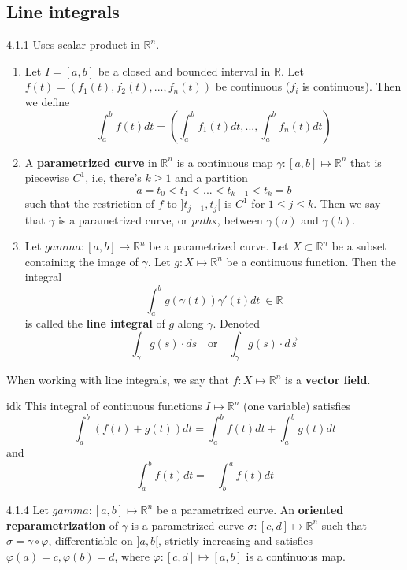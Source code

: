 \documentclass[8pt,a4paper,twocolumn,table]{extarticle}
\newcommand{\R}{\mathbb{R}}
\begin{document}
\subsection{Line integrals}
\begin{definition}{4.1.1}
    Uses scalar product in $\R^n$.

    \begin{enumerate}
        \item Let $I = [a,b]$ be a closed and bounded interval in $\R$. Let $f(t) = (f_1(t), f_2(t), ..., f_n(t))$
              be continuous ($f_i$ is continuous). Then we define
              \[ \int_a^b f(t) dt = \left( \int_a^b f_1(t) dt, ..., \int_a^b f_n(t) dt \right) \]
        \item A \textbf{parametrized curve} in $\R^n$ is a continuous map $\gamma: [a,b] \mapsto \R^n$ that is piecewise $C^1$, i.e,
              there's $k \ge 1$ and a partition
              \[ a = t_0 < t_1 < ... < t_{k-1} < t_k = b \]
              such that the restriction of $f$ to $]t_{j-1}, t_j[$ is $C^1$ for $1 \le j \le k$. Then we say that $\gamma$ is a parametrized
              curve, or \textit{path}x, between $\gamma(a)$ and $\gamma(b)$.
        \item Let $gamma: [a,b] \mapsto \R^n$ be a parametrized curve. Let $X \subset \R^n$ be a subset containing the image of $\gamma$.
              Let $g: X \mapsto \R^n$ be a continuous function. Then the integral
              \[ \int_a^b g(\gamma(t))\gamma'(t) dt\ \in \R \]
              is called the \textbf{line integral} of $g$ along $\gamma$. Denoted
              \[ \int_\gamma g(s)\cdot ds \quad \mbox{or} \quad \int_\gamma g(s) \cdot d\vec{s}\]
    \end{enumerate}
\end{definition}

When working with line integrals, we say that $f: X \mapsto \R^n$ is a \textbf{vector field}.

\begin{proposition}{idk}
    This integral  of continuous functions $I \mapsto \R^n$ (one variable) satisfies
    \[ \int_a^b (f(t) + g(t))dt = \int_a^b f(t) dt + \int_a^b g(t)dt \]
    and
    \[ \int_a^b f(t)dt = - \int_b^a f(t)dt \]
\end{proposition}

\begin{definition}{4.1.4}
    Let $gamma: [a,b] \mapsto \R^n$ be a parametrized curve. An \textbf{oriented reparametrization} of $\gamma$ is
    a parametrized curve $\sigma: [c,d] \mapsto \R^n$ such that $\sigma = \gamma \circ \varphi$, differentiable on $]a,b[$, strictly
    increasing and satisfies $\varphi(a) = c, \varphi(b) = d$, where $\varphi: [c,d] \mapsto [a,b]$ is a continuous map.
\end{definition}
\end{document}
